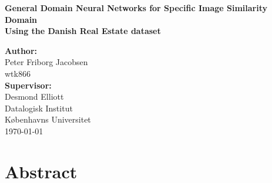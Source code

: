 \documentclass[a4paper]{article}
\begin{document}
	\AddToShipoutPicture*{\BackgroundPic}

	\begin{titlepage}
		\thispagestyle{empty}
		\vspace*{5cm}
		\begin{center}
			\Huge \textbf{General Domain Neural Networks for Specific Image Similarity Domain} \\
      \LARGE \textbf{Using the Danish Real Estate dataset } \\
		\end{center}
		\vspace*{3.5cm}
		\begin{flushleft}

			\textbf{Author:}\\
      Peter Friborg Jacobsen\\
			wtk866\\

			\vspace{3mm}
			\textbf{Supervisor:}\\
			Desmond Elliott\\
			\vspace{2.7cm}
			Datalogisk  Institut\\
			Københavns Universitet\\
			\vspace{3mm}
			\today\\

		\end{flushleft}
	\end{titlepage}

	\title{}
	\author{}

	\newpage
\newpage




\section*{Abstract}

\end{document}

